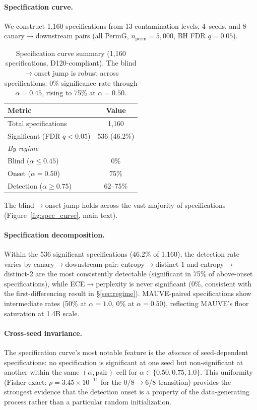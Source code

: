 \paragraph{Specification curve.}
We construct 1{,}160 specifications from 13 contamination levels, 4~seeds, and 8 canary$\to$downstream pairs (all PermG, $n_\text{perm}{=}5{,}000$, BH FDR $q{=}0.05$).

\begin{table}[t]
\centering
\small
\caption{Specification curve summary (1{,}160 specifications, D120-compliant). The blind$\to$onset jump is robust across specifications: 0\% significance rate through $\alpha{=}0.45$, rising to 75\% at $\alpha{=}0.50$.}
\label{tab:spec_curve}
\begin{tabular}{lc}
\toprule
Metric & Value \\
\midrule
Total specifications & 1{,}160 \\
Significant (FDR $q{<}0.05$) & 536 (46.2\%) \\
\midrule
\emph{By regime} & \\
\quad Blind ($\alpha \leq 0.45$) & 0\% \\
\quad Onset ($\alpha{=}0.50$) & 75\% \\
\quad Detection ($\alpha \geq 0.75$) & 62--75\% \\
\bottomrule
\end{tabular}
\end{table}

The blind$\to$onset jump holds across the vast majority of specifications (Figure~\ref{fig:spec_curve}, main text).

\paragraph{Specification decomposition.}
Within the 536 significant specifications (46.2\% of 1{,}160), the detection rate varies by canary$\to$downstream pair:
entropy$\to$distinct-1 and entropy$\to$distinct-2 are the most consistently detectable (significant in 75\% of above-onset specifications), while ECE$\to$perplexity is never significant (0\%, consistent with the first-differencing result in \S\ref{sec:regime}).
MAUVE-paired specifications show intermediate rates (50\% at $\alpha{=}1.0$, 0\% at $\alpha{=}0.50$), reflecting MAUVE's floor saturation at 1.4B scale.

\paragraph{Cross-seed invariance.}
The specification curve's most notable feature is the \emph{absence} of seed-dependent specifications: no specification is significant at one seed but non-significant at another within the same $(\alpha, \text{pair})$ cell for $\alpha \in \{0.50, 0.75, 1.0\}$.
This uniformity (Fisher exact: $p = 3.45 \times 10^{-11}$ for the 0/8$\to$6/8 transition) provides the strongest evidence that the detection onset is a property of the data-generating process rather than a particular random initialization.

